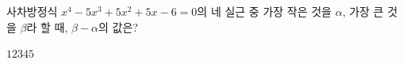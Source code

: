 사차방정식 $x^4-5x^3+5x^2+5x-6=0$의 네 실근 중 가장 작은 것을 $\alpha$, 가장 큰 것을 $\beta$라 할 때, $\beta-\alpha$의 값은?
\begin{choices32}{$1$}{$2$}{$3$}{$4$}{$5$}\end{choices32}
